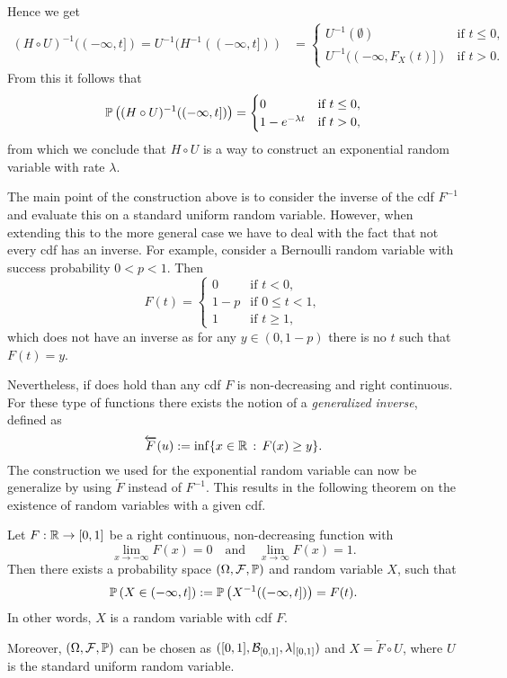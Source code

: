 Hence we get
\begin{align*}
	(H \circ U)^{-1}((-\infty, t]) = U^{-1}(H^{-1}((-\infty, t]))
	&= \begin{cases}
		U^{-1}(\emptyset) &\text{if } t \le 0,\\
		U^{-1}((-\infty, F_X(t)]) &\text{if } t > 0.
	\end{cases}
\end{align*}
From this it follows that 
\[
	\mathbb P\left((H \circ U)^{-1}((-\infty, t])\right) = \begin{cases}
			0 &\text{if } t \le 0,\\
			1-e^{-\lambda t} &\text{if } t > 0,
		\end{cases}
\]
from which we conclude that $H \circ U$ is a way to construct an exponential random variable with rate $\lambda$.

The main point of the construction above is to consider the inverse of the cdf $F^{-1}$ and evaluate this on a standard uniform random variable. However, when extending this to the more general case we have to deal with the fact that not every cdf has an inverse. For example, consider a Bernoulli random variable with success probability $0 < p < 1$. Then
\[
	F(t) = \begin{cases}
		0 &\text{if } t < 0, \\
		1-p &\text{if } 0 \le t < 1, \\
		1 &\text{if } t \ge 1,
	\end{cases}
\] 
which does not have an inverse as for any $y \in (0,1-p)$ there is no $t$ such that $F(t) = y$.

Nevertheless, if does hold than any cdf $F$ is non-decreasing and right continuous. For these type of functions there exists the notion of a \emph{generalized inverse}, defined as
\begin{equation}
	\overleftarrow{F}(u) := \inf\{ x \in \mathbb R \, : \, F(x) \ge y\}. 
\end{equation}
The construction we used for the exponential random variable can now be generalize by using $\overleftarrow{F}$ instead of $F^{-1}$. This results in the following theorem on the existence of random variables with a given cdf.

\begin{theorem}\label{thm:construction_random_variable}
Let $F : \mathbb R \to [0,1]$ be a right continuous, non-decreasing function with 
\[
	\lim_{x \to -\infty} F(x) = 0 \quad \text{and} \quad \lim_{x \to \infty} F(x) = 1.
\]
Then there exists a probability space  $(\Omega,\mathcal F, \mathbb P)$ and random variable $X$, such that 
\[
	\mathbb P\left(X \in (-\infty,t]\right) := \mathbb P\left(X^{-1}((-\infty,t])\right) = F(t).
\]
In other words, $X$ is a random variable with cdf $F$.

Moreover, $(\Omega,\mathcal F, \mathbb P)$ can be chosen as $([0,1], \mathcal B_{[0,1]}, \lambda|_{[0,1]})$ and $X = \overleftarrow{F}\circ U$, where $U$ is the standard uniform random variable.
\end{theorem}

